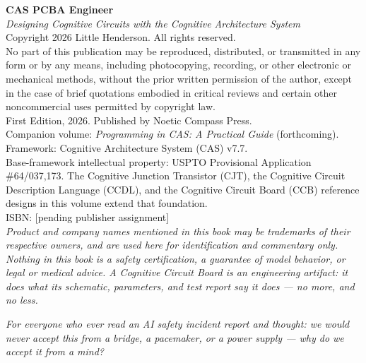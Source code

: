 \thispagestyle{empty}
\vspace*{\fill}
\begin{center}
\begin{minipage}{0.85\textwidth}
\small
\noindent
\textbf{CAS PCBA Engineer}\\
\textit{Designing Cognitive Circuits with the Cognitive Architecture System}\\[6pt]
Copyright \textcopyright{} 2026 Little Henderson. All rights reserved.\\[6pt]
No part of this publication may be reproduced, distributed, or transmitted in
any form or by any means, including photocopying, recording, or other electronic
or mechanical methods, without the prior written permission of the author, except
in the case of brief quotations embodied in critical reviews and certain other
noncommercial uses permitted by copyright law.\\[6pt]
First Edition, 2026. Published by Noetic Compass Press.\\[6pt]
Companion volume: \textit{Programming in CAS: A Practical Guide} (forthcoming).\\[6pt]
Framework: Cognitive Architecture System (CAS) v7.7.\\[6pt]
Base-framework intellectual property: USPTO Provisional Application
\#64/037,173. The Cognitive Junction Transistor (CJT), the Cognitive Circuit
Description Language (CCDL), and the Cognitive Circuit Board (CCB) reference
designs in this volume extend that foundation.\\[6pt]
ISBN: [pending publisher assignment]\\[6pt]
\textit{Product and company names mentioned in this book may be trademarks of
their respective owners, and are used here for identification and commentary
only.}\\[6pt]
\textit{Nothing in this book is a safety certification, a guarantee of model
behavior, or legal or medical advice. A Cognitive Circuit Board is an
engineering artifact: it does what its schematic, parameters, and test report
say it does --- no more, and no less.}
\end{minipage}
\end{center}
\vspace*{\fill}
\cleardoublepage

\thispagestyle{empty}
\vspace*{2.6in}
\begin{center}
\begin{minipage}{0.74\textwidth}
\itshape\centering
For everyone who ever read an AI safety incident report and thought:
we would never accept this from a bridge, a pacemaker, or a power
supply --- why do we accept it from a mind?
\end{minipage}
\end{center}
\clearpage


